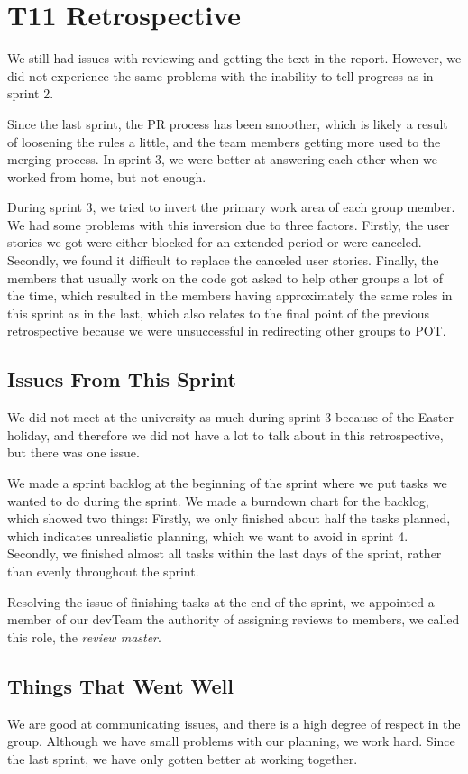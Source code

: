 \section{\gls{T11} Retrospective}

We still had issues with reviewing and getting the text in the report. However, we did not experience the same problems with the inability to tell progress as in sprint 2.

Since the last sprint, the \gls{PR} process has been smoother, which is likely a result of loosening the rules a little, and the team members getting more used to the merging process. In sprint 3, we were better at answering each other when we worked from home, but not enough.

During sprint 3, we tried to invert the primary work area of each group member. We had some problems with this inversion due to three factors. Firstly, the user stories we got were either blocked for an extended period or were canceled. Secondly, we found it difficult to replace the canceled user stories. Finally, the members that usually work on the code got asked to help other groups a lot of the time, which resulted in the members having approximately the same roles in this sprint as in the last, which also relates to the final point of the previous retrospective because we were unsuccessful in redirecting other groups to \gls{POT}.

\subsection{Issues From This Sprint}

We did not meet at the university as much during sprint 3 because of the Easter holiday, and therefore we did not have a lot to talk about in this retrospective, but there was one issue.

We made a sprint backlog at the beginning of the sprint where we put tasks we wanted to do during the sprint. We made a burndown chart for the backlog, which showed two things: Firstly, we only finished about half the tasks planned, which indicates unrealistic planning, which we want to avoid in sprint 4. Secondly, we finished almost all tasks within the last days of the sprint, rather than evenly throughout the sprint. 

Resolving the issue of finishing tasks at the end of the sprint, we appointed a member of our \gls{devTeam} the authority of assigning reviews to members, we called this role, the \textit{review master}.

\subsection{Things That Went Well}

We are good at communicating issues, and there is a high degree of respect in the group. Although we have small problems with our planning, we work hard. Since the last sprint, we have only gotten better at working together.
